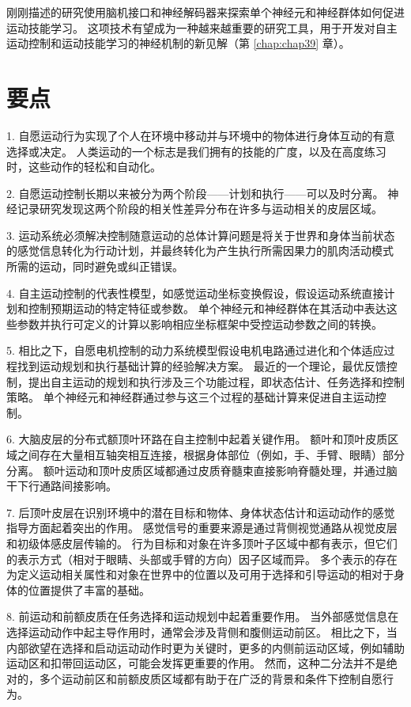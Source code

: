 刚刚描述的研究使用脑机接口和神经解码器来探索单个神经元和神经群体如何促进运动技能学习。 这项技术有望成为一种越来越重要的研究工具，用于开发对自主运动控制和运动技能学习的神经机制的新见解（第 \ref{chap:chap39} 章）。


\section{要点}

1. 自愿运动行为实现了个人在环境中移动并与环境中的物体进行身体互动的有意选择或决定。 人类运动的一个标志是我们拥有的技能的广度，以及在高度练习时，这些动作的轻松和自动化。

2. 自愿运动控制长期以来被分为两个阶段——计划和执行——可以及时分离。 神经记录研究发现这两个阶段的相关性差异分布在许多与运动相关的皮层区域。

3. 运动系统必须解决控制随意运动的总体计算问题是将关于世界和身体当前状态的感觉信息转化为行动计划，并最终转化为产生执行所需因果力的肌肉活动模式 所需的运动，同时避免或纠正错误。

4. 自主运动控制的代表性模型，如感觉运动坐标变换假设，假设运动系统直接计划和控制预期运动的特定特征或参数。 单个神经元和神经群体在其活动中表达这些参数并执行可定义的计算以影响相应坐标框架中受控运动参数之间的转换。

5. 相比之下，自愿电机控制的动力系统模型假设电机电路通过进化和个体适应过程找到运动规划和执行基础计算的经验解决方案。 最近的一个理论，最优反馈控制，提出自主运动的规划和执行涉及三个功能过程，即状态估计、任务选择和控制策略。 单个神经元和神经群通过参与这三个过程的基础计算来促进自主运动控制。

6. 大脑皮层的分布式额顶叶环路在自主控制中起着关键作用。 额叶和顶叶皮质区域之间存在大量相互轴突相互连接，根据身体部位（例如，手、手臂、眼睛）部分分离。 额叶运动和顶叶皮质区域都通过皮质脊髓束直接影响脊髓处理，并通过脑干下行通路间接影响。

7. 后顶叶皮层在识别环境中的潜在目标和物体、身体状态估计和运动动作的感觉指导方面起着突出的作用。 感觉信号的重要来源是通过背侧视觉通路从视觉皮层和初级体感皮层传输的。 行为目标和对象在许多顶叶子区域中都有表示，但它们的表示方式（相对于眼睛、头部或手臂的方向）因子区域而异。 多个表示的存在为定义运动相关属性和对象在世界中的位置以及可用于选择和引导运动的相对于身体的位置提供了丰富的基础。

8. 前运动和前额皮质在任务选择和运动规划中起着重要作用。 当外部感觉信息在选择运动动作中起主导作用时，通常会涉及背侧和腹侧运动前区。 相比之下，当内部欲望在选择和启动运动动作时更为关键时，更多的内侧前运动区域，例如辅助运动区和扣带回运动区，可能会发挥更重要的作用。 然而，这种二分法并不是绝对的，多个运动前区和前额皮质区域都有助于在广泛的背景和条件下控制自愿行为。

